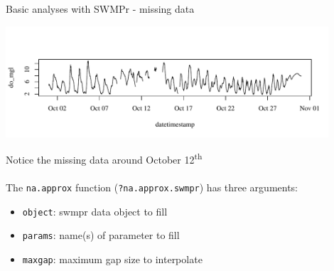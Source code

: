 \documentclass[xcolor=dvipsnames]{beamer}\usepackage[]{graphicx}\usepackage[]{color}
\newenvironment{knitrout}{}{} %
\begin{document}
\begin{frame}[fragile]{Basic analyses with SWMPr - missing data}
\begin{knitrout}\scriptsize
{}\color{fgcolor}

{\centering \includegraphics[width=0.9\textwidth]{figure/unnamed-chunk-6-1} 

}



\end{knitrout}
Notice the missing data around October 12\textsuperscript{th} \\~\\
The \texttt{na.approx} function (\texttt{?na.approx.swmpr}) has three arguments:
\begin{itemize}
\item \texttt{object}: swmpr data object to fill
\item \texttt{params}: name(s) of parameter to fill
\item \texttt{maxgap}: maximum gap size to interpolate
\end{itemize}
\end{frame}
\end{document}
